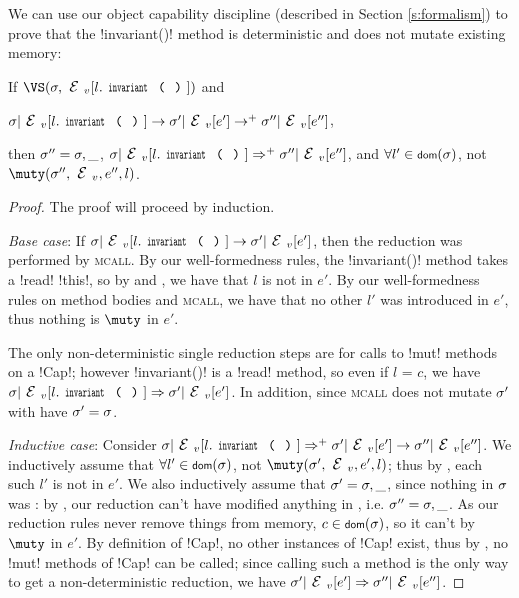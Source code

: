 We can use our object capability discipline (described in Section \ref{s:formalism}) to prove that the \Q!invariant()! method is deterministic and does not mutate existing memory:%
\SS\begin{Lemma}[Determinism]\rm If $\VS(\s, \EV[l.\invariant])$ and
\begin{iitemize}
\item[] $\s|\EV[l.\invariant] \rightarrow \s'|\EV[e'] \rightarrow^{+} \s''|\EV[e'']$,
\end{iitemize}

\indent then $\sigma'' = \sigma,\_$, $\s|\EV[l.\invariant] \Rightarrow^+ \s''|\EV[e'']$, and $\forall l' \in \dom(\s)$, not $\muty(\s'', \EV, e'', l)$.
\end{Lemma}\SS
\begin{proof}
The proof will proceed by induction.

\emph{Base case}: If $\s|\EV[l.\invariant] \rightarrow \s'|\EV[e']$, then the reduction was performed by \textsc{mcall}.
By our well-formedness rules, the \Q!invariant()! method takes a \Q!read! \Q!this!, so by  and , we have that $l$ is not \muty in $e'$. By our well-formedness rules on method bodies and \textsc{mcall}, we have that no other $l'$ was introduced in $e'$, thus nothing is $\muty$ in $e'$.

The only non-deterministic single reduction steps are for calls to \Q!mut! methods on a \Q!Cap!; however \Q!invariant()! is a \Q!read! method, so even if $l$ = $c$, we have $\s|\EV[l.\invariant] \Rightarrow \s'|\EV[e']$. In addition, since \textsc{mcall} does not mutate $\sigma'$ with have $\sigma' = \sigma$.

\emph{Inductive case}: Consider $\s|\EV[l.\invariant] \Rightarrow^+ \s'|\EV[e'] \rightarrow \s''|\EV[e'']$. We inductively assume that $\forall l' \in \dom(\s)$, not $\muty(\s', \EV, e', l)$; thus by , each such $l'$ is not \muty in $e'$. We also inductively assume that $\sigma' = \sigma,\_$, since nothing in $\sigma$ was \muty: by , our reduction can't have modified anything in \s, i.e. $\sigma'' = \sigma,\_$. As our reduction rules never remove things from memory, $c \in \dom(\s)$, so it can't by $\muty$ in $e'$. By definition of \Q!Cap!, no other instances of \Q!Cap! exist, thus by , no \Q!mut! methods of \Q!Cap! can be called; since calling such a method is the only way to get a non-deterministic reduction, we have $\s'|\EV[e'] \Rightarrow \s''|\EV[e'']$.
\end{proof}

